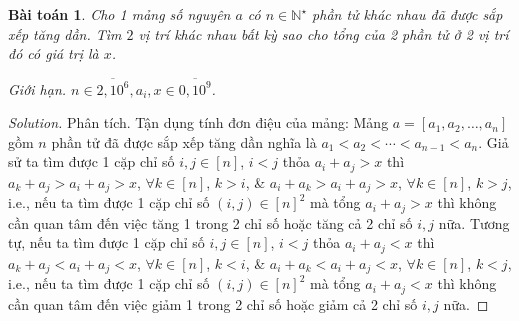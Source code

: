 \documentclass{article}
\newtheorem{baitoan}{Bài toán}
\begin{document}
\begin{baitoan}
    Cho 1 mảng số nguyên $a$ có $n\in\mathbb{N}^\star$ phần tử khác nhau đã được sắp xếp tăng dần. Tìm $2$ vị trí khác nhau bất kỳ sao cho tổng của 2 phần tử ở 2 vị trí đó có giá trị là $x$.
    \item {\sf Giới hạn.} $n\in\overline{2,10^6},a_i,x\in\overline{0,10^9}$.
\end{baitoan}

\begin{proof}[Solution]
    \item {\sf Phân tích.} Tận dụng tính đơn điệu của mảng: Mảng $a = [a_1,a_2,\ldots,a_n]$ gồm $n$ phần tử đã được sắp xếp tăng dần nghĩa là $a_1 < a_2 < \cdots < a_{n-1} < a_n$. Giả sử ta tìm được 1 cặp chỉ số $i,j\in[n]$, $i < j$ thỏa $a_i + a_j > x$ thì $a_k + a_j > a_i + a_j > x$, $\forall k\in[n]$, $k > i$, \& $a_i + a_k > a_i + a_j > x$, $\forall k\in[n]$, $k > j$, i.e., nếu ta tìm được 1 cặp chỉ số $(i,j)\in[n]^2$ mà tổng $a_i + a_j > x$ thì không cần quan tâm đến việc tăng 1 trong 2 chỉ số hoặc tăng cả 2 chỉ số $i,j$ nữa. Tương tự, nếu ta tìm được 1 cặp chỉ số $i,j\in[n]$, $i < j$ thỏa $a_i + a_j < x$ thì $a_k + a_j < a_i + a_j < x$, $\forall k\in[n]$, $k < i$, \& $a_i + a_k < a_i + a_j < x$, $\forall k\in[n]$, $k < j$, i.e., nếu ta tìm được 1 cặp chỉ số $(i,j)\in[n]^2$ mà tổng $a_i + a_j < x$ thì không cần quan tâm đến việc giảm 1 trong 2 chỉ số hoặc giảm cả 2 chỉ số $i,j$ nữa.


\end{proof}
\end{document}
